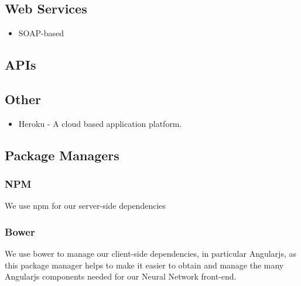 \subsection{Web Services}
\begin{itemize}
	\item SOAP-based
\end{itemize} 

\subsection{APIs}
\subsection{Other}
\begin{itemize}
	\item Heroku - A cloud based application platform.
\end{itemize}

\subsection{Package Managers}
\subsubsection{NPM}
We use npm for our server-side dependencies
\subsubsection{Bower}
We use bower to manage our client-side dependencies, in particular Angularjs, as this package manager helps to make it easier to obtain and manage the many Angularjs components needed for our Neural Network front-end.





